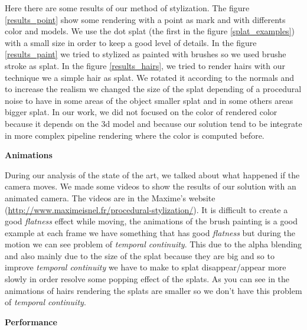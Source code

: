 Here there are some results of our method of stylization. The figure \ref{results_point} show some rendering with a point as mark and with differents color and models. We use the dot splat (the first in the figure \ref{splat_examples}) with a small size in order to keep a good level of details. In the figure \ref{results_paint} we tried to stylized as painted with brushes so we used brushe stroke as splat. In the figure \ref{results_hairs}, we tried to render hairs with our technique we a simple hair as splat. We rotated it according to the normals and to increase the realism we changed the size of the splat depending of a procedural noise to have in some areas of the object smaller splat and in some others areas bigger splat. In our work, we did not focused on the color of rendered color because it depends on the 3d model and because our solution tend to be integrate in more complex pipeline rendering where the color is computed before.\newline

\textbf{Animations}

During our analysis of the state of the art, we talked about what happened if the camera moves. We made some videos to show the results of our solution with an animated camera. The videos are in the Maxime's website (\href{http://www.maximeisnel.fr/procedural-stylization/}{http://www.maximeisnel.fr/procedural-stylization/}). It is difficult to create a good \textit{flatness} effect while moving, the animations of the brush painting is a good example at each frame we have something that has good \textit{flatness} but during the motion we can see problem of \textit{temporal continuity}. This due to the alpha blending and also mainly due to the size of the splat because they are big and so to improve \textit{temporal continuity} we have to make to splat disappear/appear more slowly in order resolve some popping effect of the splats. As you can see in the animations of hairs rendering the splats are smaller so we don't have this problem of \textit{temporal continuity}. \newline


\textbf{Performance}

